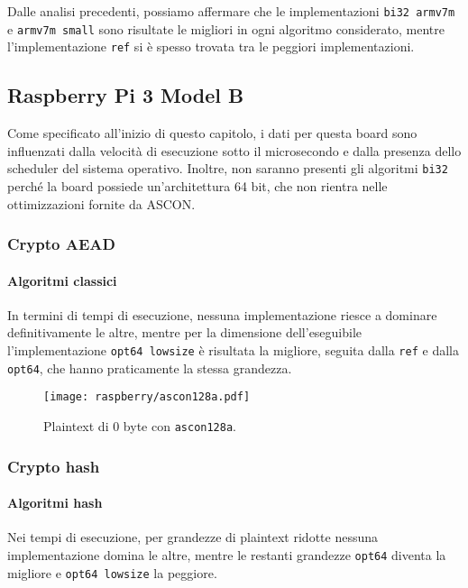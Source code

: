 Dalle analisi precedenti, possiamo affermare che le implementazioni \texttt{bi32 armv7m} e \texttt{armv7m small} sono risultate le migliori in ogni algoritmo considerato, mentre l'implementazione \texttt{ref} si è spesso trovata tra le peggiori implementazioni.

\subsection{Raspberry Pi 3 Model B}

Come specificato all'inizio di questo capitolo, i dati per questa board sono influenzati dalla velocità di esecuzione sotto il microsecondo e dalla presenza dello scheduler del sistema operativo. Inoltre, non saranno presenti gli algoritmi \texttt{bi32} perché la board possiede un'architettura 64 bit, che non rientra nelle ottimizzazioni fornite da ASCON.

\subsubsection{Crypto AEAD}

\paragraph{Algoritmi classici}

In termini di tempi di esecuzione, nessuna implementazione riesce a dominare definitivamente le altre, mentre per la dimensione dell'eseguibile l'implementazione \texttt{opt64 lowsize} è risultata la migliore, seguita dalla \texttt{ref} e dalla \texttt{opt64}, che hanno praticamente la stessa grandezza.

\begin{figure}[H]
    \centering
    \texttt{[image: raspberry/ascon128a.pdf]}
    \caption{Plaintext di 0 byte con \texttt{ascon128a}.}
\end{figure}

\subsubsection{Crypto hash}

\paragraph{Algoritmi hash}

Nei tempi di esecuzione, per grandezze di plaintext ridotte nessuna implementazione domina le altre, mentre le restanti grandezze \texttt{opt64} diventa la migliore e \texttt{opt64 lowsize} la peggiore. \\

